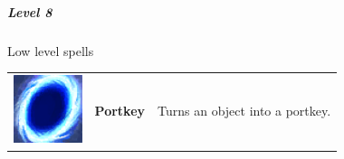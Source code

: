 \subparagraph{Level 8} 
Low level spells \\
\begin{tabular}{ m{2cm}m{3cm}m{8cm} } 
  	\includegraphics[width=2cm]{../Pictures/Gameplay/Spells/Icon/Portkey_spell_icon.png} & \textbf{Portkey} & Turns an object into a portkey.\\ 
\end{tabular}


\pagebreak









